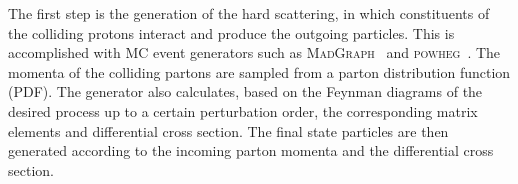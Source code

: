 The first step is the generation of the hard scattering, in which constituents 
of the colliding protons interact and produce the outgoing particles. This is 
accomplished with MC event generators such as 
\textsc{MadGraph}~\cite{madgraph} and \textsc{powheg}~\cite{powheg}. 
The momenta of the colliding partons are sampled from a parton distribution 
function (PDF). 
The generator also calculates, based on the Feynman diagrams of the desired 
process up to a certain perturbation order, the corresponding matrix 
elements and differential cross section. The final state particles are then 
generated according to the incoming parton momenta and the differential cross 
section.

